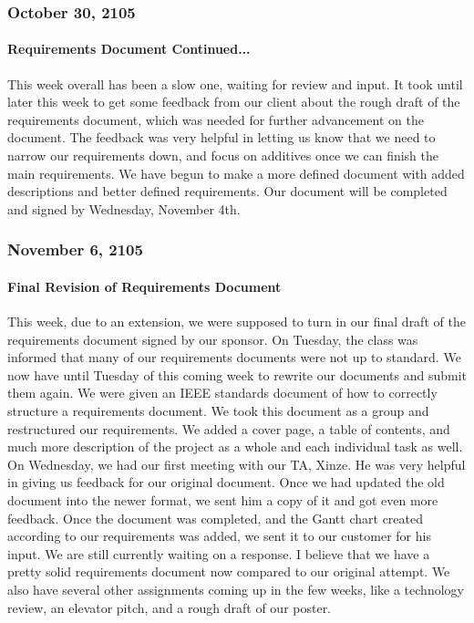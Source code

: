 \subsubsection{October 30, 2105}
\paragraph{Requirements Document Continued...}
This week overall has been a slow one, waiting for review and input. It took until later this week to get some feedback from our client about the rough draft of the requirements document, which was needed for further advancement on the document. The feedback was very helpful in letting us know that we need to narrow our requirements down, and focus on additives once we can finish the main requirements. We have begun to make a more defined document with added descriptions and better defined requirements. Our document will be completed and signed by Wednesday, November 4th.\\

\subsubsection{November 6, 2105}
\paragraph{Final Revision of Requirements Document}
This week, due to an extension, we were supposed to turn in our final draft of the requirements document signed by our sponsor. On Tuesday, the class was informed that many of our requirements documents were not up to standard. We now have until Tuesday of this coming week to rewrite our documents and submit them again. We were given an IEEE standards document of how to correctly structure a requirements document. We took this document as a group and restructured our requirements. We added a cover page, a table of contents, and much more description of the project as a whole and each individual task as well. On Wednesday, we had our first meeting with our TA, Xinze. He was very helpful in giving us feedback for our original document. Once we had updated the old document into the newer format, we sent him a copy of it and got even more feedback. Once the document was completed, and the Gantt chart created according to our requirements was added, we sent it to our customer for his input. We are still currently waiting on a response. I believe that we have a pretty solid requirements document now compared to our original attempt. We also have several other assignments coming up in the few weeks, like a technology review, an elevator pitch, and a rough draft of our poster.\\

